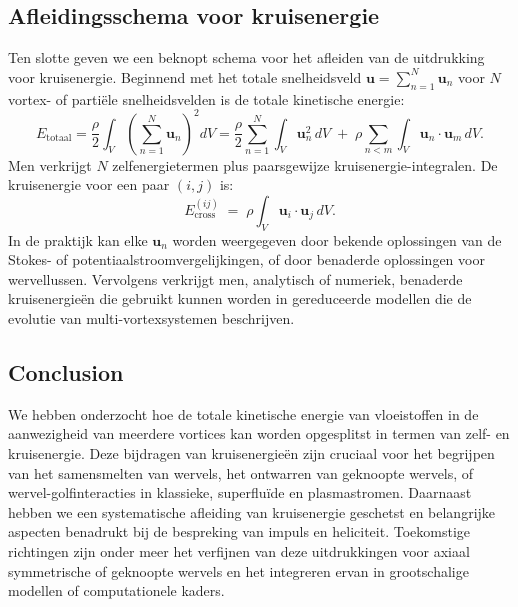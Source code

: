 \subsection{Afleidingsschema voor kruisenergie}
\label{sec:derivation}
Ten slotte geven we een beknopt schema voor het afleiden van de uitdrukking voor kruisenergie. Beginnend met het totale snelheidsveld $\mathbf{u} = \sum_{n=1}^N \mathbf{u}_n$
voor $N$ vortex- of partiële snelheidsvelden is de totale kinetische energie:
\begin{equation}
E_{\text{totaal}}
= \frac{\rho}{2} \int_V \left(\sum_{n=1}^N \mathbf{u}_n \right)^2 dV
= \frac{\rho}{2} \sum_{n=1}^N \int_V \mathbf{u}_n^2 \, dV
\;+\;\rho \sum_{n<m} \int_V \mathbf{u}_n \cdot \mathbf{u}_m \, dV.\label{eq:appendix:total-energy-derivation}
\end{equation}
Men verkrijgt $N$ zelfenergietermen plus paarsgewijze kruisenergie-integralen.
De kruisenergie voor een paar $(i,j)$ is:
\begin{equation}
E_{\text{cross}}^{(ij)} \;=\; \rho \int_V \mathbf{u}_i \cdot \mathbf{u}_j \, dV.\label{eq:appendix:cross-energy-derivation}
\end{equation}
In de praktijk kan elke $\mathbf{u}_n$ worden weergegeven door bekende oplossingen van de
Stokes- of potentiaalstroomvergelijkingen, of door benaderde oplossingen voor wervellussen. Vervolgens verkrijgt men, analytisch of numeriek, benaderde kruisenergieën
die gebruikt kunnen worden in gereduceerde modellen die de evolutie van multi-vortexsystemen beschrijven.

\subsection*{Conclusion}
We hebben onderzocht hoe de totale kinetische energie van vloeistoffen in de aanwezigheid van meerdere
vortices kan worden opgesplitst in termen van zelf- en kruisenergie. Deze bijdragen van kruisenergieën
zijn cruciaal voor het begrijpen van het samensmelten van wervels, het ontwarren van geknoopte wervels, of wervel-golfinteracties in klassieke, superfluïde en plasmastromen. Daarnaast hebben we een systematische afleiding van kruisenergie geschetst en
belangrijke aspecten benadrukt bij de bespreking van impuls en heliciteit. Toekomstige richtingen
zijn onder meer het verfijnen van deze uitdrukkingen voor axiaal symmetrische of geknoopte wervels en
het integreren ervan in grootschalige modellen of computationele kaders.